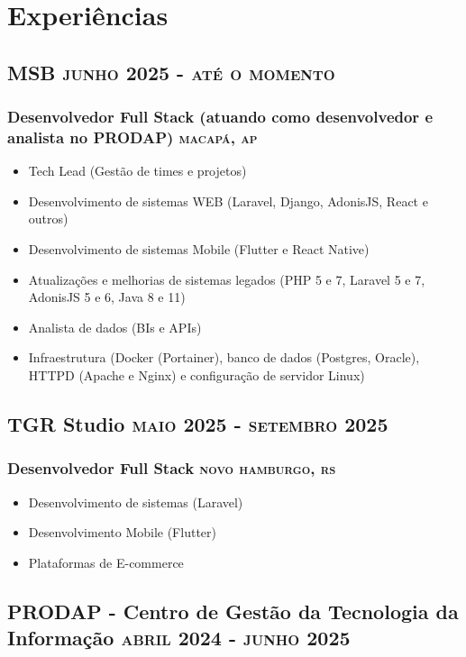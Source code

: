 \documentclass{article}
\newcommand{\rside}[1]{\hfill \normalfont\scshape\MakeLowercase{#1}}
\begin{document}
\section{\faChartPie\enspace Experiências}

\subsection{MSB \rside{Junho 2025 - Até o momento}}
\subsubsection{Desenvolvedor Full Stack (atuando como desenvolvedor e analista no PRODAP) \rside{Macapá, AP}}
\begin{itemize}
  \item Tech Lead (Gestão de times e projetos)
  \item Desenvolvimento de sistemas WEB (Laravel, Django, AdonisJS, React e outros)
  \item Desenvolvimento de sistemas Mobile (Flutter e React Native)
  \item Atualizações e melhorias de sistemas legados (PHP 5 e 7, Laravel 5 e 7, AdonisJS 5 e 6, Java 8 e 11)
  \item Analista de dados (BIs e APIs)
  \item Infraestrutura (Docker (Portainer), banco de dados (Postgres, Oracle), HTTPD (Apache e Nginx) e configuração de servidor Linux)
\end{itemize}

\subsection{TGR Studio \rside{Maio 2025 - Setembro 2025}}
\subsubsection{Desenvolvedor Full Stack \rside{Novo Hamburgo, RS}}
\begin{itemize}
  \item Desenvolvimento de sistemas (Laravel)
  \item Desenvolvimento Mobile (Flutter)
  \item Plataformas de E-commerce
\end{itemize}

\subsection{PRODAP - Centro de Gestão da Tecnologia da Informação \rside{Abril 2024 - Junho 2025}}
\end{document}
